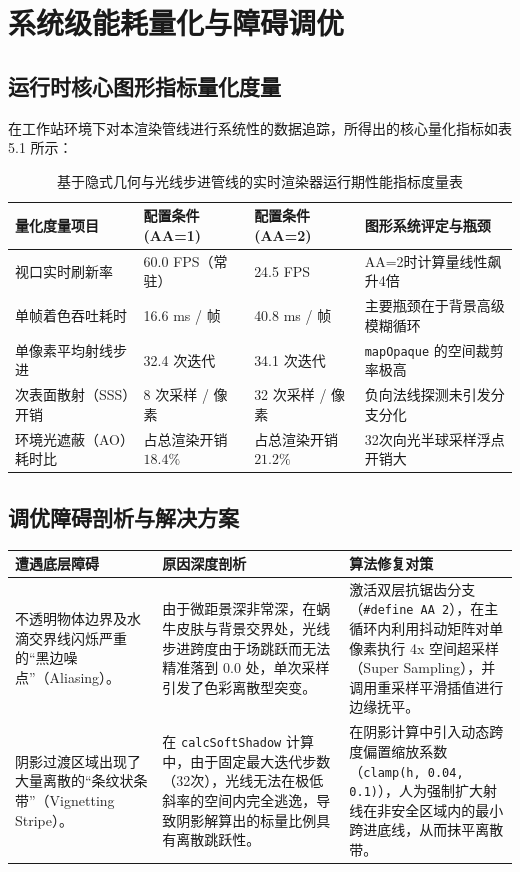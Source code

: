 \documentclass[11pt, a4paper, oneside]{report}
\newcommand{\code}[1]{\texttt{#1}}
\begin{document}
\chapter{系统级能耗量化与障碍调优}
\section{运行时核心图形指标量化度量}
在工作站环境下对本渲染管线进行系统性的数据追踪，所得出的核心量化指标如表 5.1 所示：

\begin{table}[H]
\centering
\begin{tabular}{p{} p{} p{} p{}}
\toprule
\textbf{量化度量项目} & \textbf{配置条件(AA=1)} & \textbf{配置条件(AA=2)} & \textbf{图形系统评定与瓶颈} \\
\midrule
视口实时刷新率 & 60.0 FPS（常驻） & 24.5 FPS & AA=2时计算量线性飙升4倍 \\
单帧着色吞吐耗时 & 16.6 ms / 帧 & 40.8 ms / 帧 & 主要瓶颈在于背景高级模糊循环 \\
单像素平均射线步进 & 32.4 次迭代 & 34.1 次迭代 & \code{mapOpaque} 的空间裁剪率极高 \\
次表面散射（SSS）开销 & 8 次采样 / 像素 & 32 次采样 / 像素 & 负向法线探测未引发分支分化 \\
环境光遮蔽（AO）耗时比 & 占总渲染开销 $18.4\%$ & 占总渲染开销 $21.2\%$ & 32次向光半球采样浮点开销大 \\
\bottomrule
\end{tabular}
\caption{基于隐式几何与光线步进管线的实时渲染器运行期性能指标度量表}
\end{table}

\section{调优障碍剖析与解决方案}
\begin{longtable}{|p{}|p{}|p{}|}
\hline
\textbf{遭遇底层障碍} & \textbf{原因深度剖析} & \textbf{算法修复对策} \\
\hline
不透明物体边界及水滴交界线闪烁严重的“黑边噪点”（Aliasing）。 & 由于微距景深非常深，在蜗牛皮肤与背景交界处，光线步进跨度由于场跳跃而无法精准落到 $0.0$ 处，单次采样引发了色彩离散型突变。 & 激活双层抗锯齿分支（\code{#define AA 2}），在主循环内利用抖动矩阵对单像素执行 4x 空间超采样（Super Sampling），并调用重采样平滑插值进行边缘抚平。 \\
\hline
阴影过渡区域出现了大量离散的“条纹状条带”（Vignetting Stripe）。 & 在 \code{calcSoftShadow} 计算中，由于固定最大迭代步数（32次），光线无法在极低斜率的空间内完全逃逸，导致阴影解算出的标量比例具有离散跳跃性。 & 在阴影计算中引入动态跨度偏置缩放系数（\code{clamp(h, 0.04, 0.1)}），人为强制扩大射线在非安全区域内的最小跨进底线，从而抹平离散带。 \\
\hline
\end{longtable}
\end{document}
